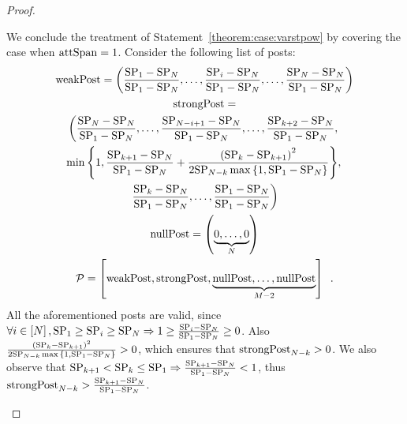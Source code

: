 \begin{proof}
\begin{itemize}
    We conclude the treatment of Statement~\ref{theorem:case:varstpow} by
    covering the case when $\mathrm{attSpan} = 1$. Consider the following list of posts:
    \begin{gather*}
      \mathrm{weakPost} = \left(\frac{\mathrm{SP}_1 - \mathrm{SP}_N}{\mathrm{SP}_1 -
      \mathrm{SP}_N}, \dots, \frac{\mathrm{SP}_i - \mathrm{SP}_N}{\mathrm{SP}_1 -
      \mathrm{SP}_N}, \dots, \frac{\mathrm{SP}_N -
      \mathrm{SP}_N}{\mathrm{SP}_1 - \mathrm{SP}_N}\right) \\
      \mathrm{strongPost} = \\
      \left(\frac{\mathrm{SP}_N - \mathrm{SP}_N}{\mathrm{SP}_1 -
      \mathrm{SP}_N}, \dots, \frac{\mathrm{SP}_{N - i + 1} -
      \mathrm{SP}_N}{\mathrm{SP}_1 - \mathrm{SP}_N}, \dots, \frac{\mathrm{SP}_{k +
      2} - \mathrm{SP}_N}{\mathrm{SP}_1 - \mathrm{SP}_N}, \right. \\
      \left. \min{\left\{1, \frac{\mathrm{SP}_{k + 1} - \mathrm{SP}_N}{\mathrm{SP}_1 -
      \mathrm{SP}_N} + \frac{\left(\mathrm{SP}_k -
      \mathrm{SP}_{k+1}\right)^2}{2\mathrm{SP}_{N- k}\max{\left\{1, \mathrm{SP}_1 -
      \mathrm{SP}_N\right\}}}\right\}},\right. \\
      \left.\frac{\mathrm{SP}_{k} - \mathrm{SP}_N}{\mathrm{SP}_1 - \mathrm{SP}_N},
      \dots, \frac{\mathrm{SP}_1 - \mathrm{SP}_N}{\mathrm{SP}_1 -
      \mathrm{SP}_N}\right) \\
      \mathrm{nullPost} = \left(\underbrace{0, \dots, 0}_{N}\right) \\
      \mathcal{P} = \left[\mathrm{weakPost}, \mathrm{strongPost}, \underbrace{\mathrm{nullPost}, \dots,
      \mathrm{nullPost}}_{M - 2}\right] \enspace.
    \end{gather*}
    All the aforementioned posts are valid, since $\forall i \in
    \left[N\right], \mathrm{SP}_1 \geq \mathrm{SP}_i \geq \mathrm{SP}_N
    \Rightarrow 1 \geq \frac{\mathrm{SP}_i - \mathrm{SP}_N}{\mathrm{SP}_1 -
    \mathrm{SP}_N} \geq 0$. Also $\frac{\left(\mathrm{SP}_k -
    \mathrm{SP}_{k+1}\right)^2}{2\mathrm{SP}_{N - k}\max{\left\{1, \mathrm{SP}_1 -
    \mathrm{SP}_N\right\}}} > 0$, which ensures that
    $\mathrm{strongPost}_{N - k} > 0$. We also observe that $\mathrm{SP}_{k+1} <
    \mathrm{SP}_k \leq \mathrm{SP}_1 \Rightarrow \frac{\mathrm{SP}_{k+1} -
    \mathrm{SP}_N}{\mathrm{SP}_1 - \mathrm{SP}_N} < 1$, thus
    $\mathrm{strongPost}_{N - k} > \frac{\mathrm{SP}_{k+1} -
    \mathrm{SP}_N}{\mathrm{SP}_1 - \mathrm{SP}_N}$.


\end{itemize}
\end{proof}
